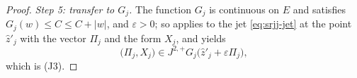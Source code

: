 \begin{proof}
\emph{Step 5: transfer to $G_j$.}
The function $G_j$ is continuous on $E$ and satisfies $G_j(w)\le C\le C+|w|$,
and $\varepsilon>0$; so  applies to the jet
\eqref{eq:srjj-jet} at the point $\widehat z'_j$ with the vector $\Pi_j$ and the
form $X_j$, and yields
\[
  \bigl(\Pi_j,X_j\bigr)
   \in J^{2,+}G_j\bigl(\widehat z'_j+\varepsilon\Pi_j\bigr),
\]
which is (J3).
\end{proof}
